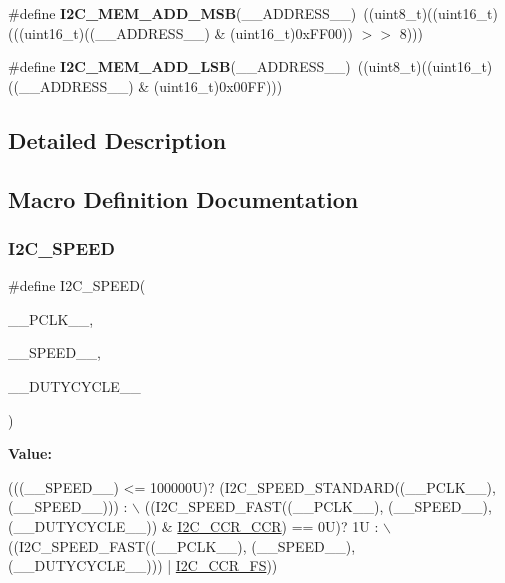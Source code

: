 \begin{DoxyCompactItemize}
\mbox{\label{group___i2_c___private___macros_ga2e42fa55be22240dc5a54a0304d01cfb}} 
\#define {\bfseries I2\+C\+\_\+\+M\+E\+M\+\_\+\+A\+D\+D\+\_\+\+M\+SB}(\+\_\+\+\_\+\+A\+D\+D\+R\+E\+S\+S\+\_\+\+\_\+)~((uint8\+\_\+t)((uint16\+\_\+t)(((uint16\+\_\+t)((\+\_\+\+\_\+\+A\+D\+D\+R\+E\+S\+S\+\_\+\+\_\+) \& (uint16\+\_\+t)0x\+F\+F00)) $>$$>$ 8)))
\item 
\mbox{\label{group___i2_c___private___macros_ga9c8f1a763307d0c37bb4e2dcfdf3bb9f}} 
\#define {\bfseries I2\+C\+\_\+\+M\+E\+M\+\_\+\+A\+D\+D\+\_\+\+L\+SB}(\+\_\+\+\_\+\+A\+D\+D\+R\+E\+S\+S\+\_\+\+\_\+)~((uint8\+\_\+t)((uint16\+\_\+t)((\+\_\+\+\_\+\+A\+D\+D\+R\+E\+S\+S\+\_\+\+\_\+) \& (uint16\+\_\+t)0x00\+F\+F)))
\end{DoxyCompactItemize}


\subsection{Detailed Description}


\subsection{Macro Definition Documentation}
\mbox{\label{group___i2_c___private___macros_ga0e871b470a0f7a9d641156f07e37c810}} 
\subsubsection{\texorpdfstring{I2\+C\+\_\+\+S\+P\+E\+ED}{I2C\_SPEED}}
{\footnotesize\ttfamily \#define I2\+C\+\_\+\+S\+P\+E\+ED(\begin{DoxyParamCaption}\item[{}]{\+\_\+\+\_\+\+P\+C\+L\+K\+\_\+\+\_\+,  }\item[{}]{\+\_\+\+\_\+\+S\+P\+E\+E\+D\+\_\+\+\_\+,  }\item[{}]{\+\_\+\+\_\+\+D\+U\+T\+Y\+C\+Y\+C\+L\+E\+\_\+\+\_\+ }\end{DoxyParamCaption})}

{\bfseries Value\+:}
\begin{DoxyCode}
(((\_\_SPEED\_\_) <= 100000U)? (I2C\_SPEED\_STANDARD((\_\_PCLK\_\_), (\_\_SPEED\_\_))) : \(\backslash\)
                                                                  ((I2C\_SPEED\_FAST((\_\_PCLK\_\_), (\_\_SPEED\_\_),
       (\_\_DUTYCYCLE\_\_)) & \mbox{\hyperlink{group___peripheral___registers___bits___definition_ga5c8cb2bd83dd7dbdcf6ca4bbf4a841de}{I2C\_CCR\_CCR}}) == 0U)? 1U : \(\backslash\)
                                                                  ((I2C\_SPEED\_FAST((\_\_PCLK\_\_), (\_\_SPEED\_\_),
       (\_\_DUTYCYCLE\_\_))) | \mbox{\hyperlink{group___peripheral___registers___bits___definition_gaea64e5d7eba609ac9a84964bc0bc2def}{I2C\_CCR\_FS}}))
\end{DoxyCode}
